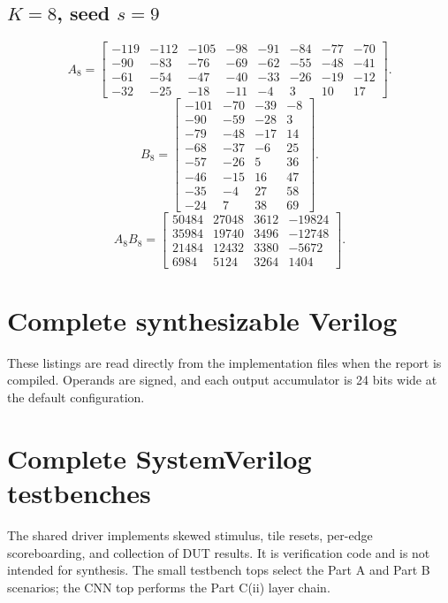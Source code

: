 \documentclass[10pt,twocolumn,letterpaper]{article}
\begin{document}
\subsection{\texorpdfstring{$K=8$, seed $s=9$}{K=8, seed 9}}
\[
A_8=\begin{bmatrix}-119&-112&-105&-98&-91&-84&-77&-70\\-90&-83&-76&-69&-62&-55&-48&-41\\-61&-54&-47&-40&-33&-26&-19&-12\\-32&-25&-18&-11&-4&3&10&17\end{bmatrix}.
\]
\[
B_8=\begin{bmatrix}-101&-70&-39&-8\\-90&-59&-28&3\\-79&-48&-17&14\\-68&-37&-6&25\\-57&-26&5&36\\-46&-15&16&47\\-35&-4&27&58\\-24&7&38&69\end{bmatrix}.
\]
\[
A_8B_8=\begin{bmatrix}50484&27048&3612&-19824\\35984&19740&3496&-12748\\21484&12432&3380&-5672\\6984&5124&3264&1404\end{bmatrix}.
\]

\section{Complete synthesizable Verilog}\label{app:rtl}
These listings are read directly from the implementation files when the
report is compiled. Operands are signed, and each output accumulator is
24 bits wide at the default configuration.



\clearpage
\section{Complete SystemVerilog testbenches}\label{app:tests}
The shared driver implements skewed stimulus, tile resets, per-edge
scoreboarding, and collection of DUT results. It is verification code and
is not intended for synthesis. The small testbench tops select the Part A
and Part B scenarios; the CNN top performs the Part C(ii) layer chain.




\end{document}
